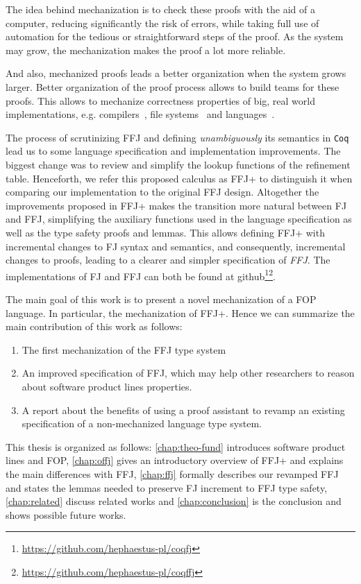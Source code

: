 The idea behind mechanization is to check these proofs with the aid of a computer, reducing significantly the risk of errors, while 
taking full use of automation for the tedious or straightforward steps of the proof. As the system may grow, the mechanization makes
the proof a lot more reliable.

And also, mechanized proofs leads a better organization when the system grows larger.
Better organization of the proof process allows to build teams for these proofs. 
This allows to mechanize correctness properties of big, real world implementations, e.g. compilers~\cite{leroy2012compcert}, 
file systems~\cite{arkoudas2004verifying, amani2015specifying} and languages~\cite{hartel2000formalising, klein2006machine}. 

The process of scrutinizing \gls{FFJ} and defining \textit{unambiguously} its semantics in \texttt{Coq} 
lead us to some language specification and implementation improvements. The biggest change was to review and
simplify the lookup functions of the refinement table.
Henceforth, we refer this proposed calculus as \gls{FFJ+} to distinguish it when comparing our implementation to the original \gls{FFJ} design.
Altogether the improvements proposed in \gls{FFJ+} makes the transition more natural between \gls{FJ} and \gls{FFJ}, 
simplifying the auxiliary functions used in the language specification as well as the type safety proofs and lemmas. 
This allows defining \gls{FFJ+} with incremental changes to \gls{FJ} syntax and semantics, 
and consequently, incremental changes to proofs, leading to a clearer and simpler specification of \textit{FFJ}.
The implementations of \gls{FJ} and \gls{FFJ} can both be found at github\footnote{\url{https://github.com/hephaestus-pl/coqfj}}\footnote{\url{https://github.com/hephaestus-pl/coqffj}}.


The main goal of this work is to present a novel mechanization of a \gls{FOP} language. In particular, the mechanization of \gls{FFJ+}.
Hence we can summarize the main contribution of this work as follows:
\begin{enumerate}
    \item The first mechanization of the \gls{FFJ} type system
    \item An improved specification of \gls{FFJ}, which may help other researchers to reason about software product lines properties.
    \item A report about the benefits of using a proof assistant to revamp an existing specification of a non-mechanized language type system.
\end{enumerate}

This thesis is organized as follows:
\cref{chap:theo-fund} introduces software product lines and \gls{FOP},
\cref{chap:offj} gives an introductory overview of \gls{FFJ+} and explains the main differences with \gls{FFJ},
\cref{chap:ffj} formally describes our revamped \gls{FFJ} and states the lemmas needed to preserve \gls{FJ} increment to \gls{FFJ} type safety, 
\cref{chap:related} discuss related works and
\cref{chap:conclusion} is the conclusion and shows possible future works.
